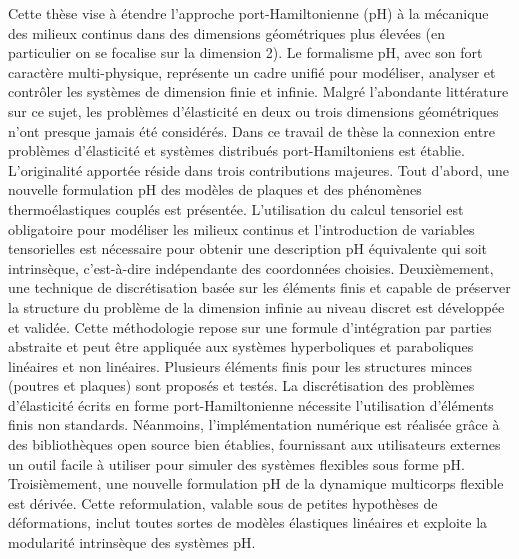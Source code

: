 \documentclass{article}
\begin{document}
Cette thèse vise à étendre l'approche port-Hamiltonienne (pH) à la mécanique des milieux continus dans des dimensions géométriques plus élevées (en particulier on se focalise sur la dimension 2). Le formalisme pH, avec son fort caractère multi-physique, représente un cadre unifié pour modéliser, analyser et contrôler les systèmes de dimension finie et infinie. Malgré l'abondante littérature sur ce sujet, les problèmes d'élasticité en deux ou trois dimensions géométriques n'ont presque jamais été considérés. Dans ce travail de thèse la connexion entre problèmes d'élasticité et systèmes distribués port-Hamiltoniens est établie. L'originalité apportée réside dans trois contributions majeures. Tout d'abord, une nouvelle formulation pH des modèles de plaques et des phénomènes thermoélastiques couplés est présentée. L'utilisation du calcul tensoriel est obligatoire pour modéliser les milieux  continus et l'introduction de variables tensorielles est nécessaire pour obtenir une description pH équivalente qui soit intrinsèque, c'est-à-dire indépendante des coordonnées choisies. Deuxièmement, une technique de discrétisation basée sur les éléments finis et capable de préserver la structure du problème de la dimension infinie au niveau discret est développée et validée. Cette méthodologie repose sur une formule d'intégration par parties abstraite et peut être appliquée aux systèmes hyperboliques et paraboliques linéaires et non linéaires. Plusieurs éléments finis pour les structures minces (poutres et plaques) sont proposés et testés. La discrétisation des problèmes d'élasticité écrits en forme port-Hamiltonienne nécessite l'utilisation d'éléments finis non standards. Néanmoins, l'implémentation numérique est réalisée grâce à des bibliothèques open source bien établies, fournissant aux utilisateurs externes un outil facile à utiliser pour simuler des systèmes flexibles sous forme pH. Troisièmement, une nouvelle formulation pH de la dynamique multicorps flexible est dérivée. Cette reformulation, valable sous de petites hypothèses de déformations, inclut toutes sortes de modèles élastiques linéaires et exploite la modularité intrinsèque des systèmes pH.


\nocite{*}


\end{document}
